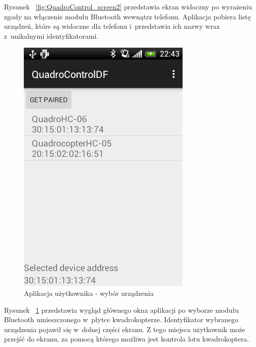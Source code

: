 \documentclass[11pt, twoside]{Thesis} %
\begin{document}
Rysunek ~\ref{fig:QuadroControl_screen2} przedstawia ekran widoczny po wyrażeniu zgody na włączenie modułu Bluetooth wewnątrz telefonu. Aplikacja pobiera listę urządzeń, które są widoczne dla telefonu i~przedstawia ich nazwy wraz z~unikalnymi identyfikatorami. 

\begin{figure}[htbp]
	\centering
	\includegraphics[scale=0.6]{Pictures/DroidAtScreen/droid@screen-3.png}
	\caption[Aplikacja użytkownika - wybór urządzenia]{Aplikacja użytkownika - wybór urządzenia}
	\label{fig:QuadroControl_screen3}
\end{figure}

Rysunek ~\ref{fig:QuadroControl_screen3} przedstawia wygląd głównego okna aplikacji po wyborze modułu Bluetooth umieszczonego w~płytce kwadrokopterze. Identyfikator wybranego urządzenia pojawił się w~dolnej części ekranu. Z tego miejsca użytkownik może przejść do ekranu, za pomocą którego możliwa jest kontrola lotu kwadrokoptera.
\end{document}
